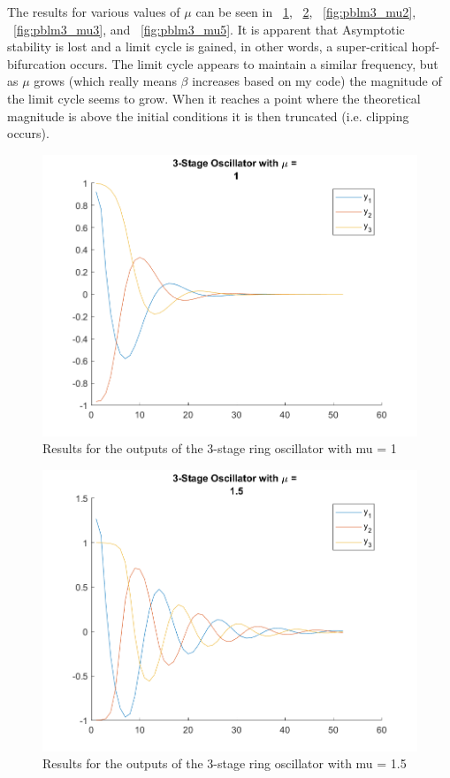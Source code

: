 \documentclass[letter]{article}
\begin{document}
The results for various values of $\mu$ can be seen in \figurename \  \ref{fig:pblm3_mu1}, \figurename \ \ref{fig:pblm3_mu15}, \figurename \ \ref{fig:pblm3_mu2}, \figurename \ \ref{fig:pblm3_mu3}, and \figurename \ \ref{fig:pblm3_mu5}. It is apparent that Asymptotic stability is lost and a limit cycle is gained, in other words, a super-critical hopf-bifurcation occurs. The limit cycle appears to maintain a similar frequency, but as $\mu$ grows (which really means $\beta$ increases based on my code) the magnitude of the limit cycle seems to grow. When it reaches a point where the theoretical magnitude is above the initial conditions it is then truncated (i.e. clipping occurs).


\begin{figure}[p]
	\centering
	\includegraphics[width=0.7\linewidth]{fig/HW6_pblm3_results_mu_1}
	\caption{Results for the outputs of the 3-stage ring oscillator with mu = 1}
	\label{fig:pblm3_mu1}
\end{figure}

\begin{figure}[p]
	\centering
	\includegraphics[width=0.7\linewidth]{fig/HW6_pblm3_results_mu_1.5}
	\caption{Results for the outputs of the 3-stage ring oscillator with mu = 1.5}
	\label{fig:pblm3_mu15}
\end{figure}
\end{document}
